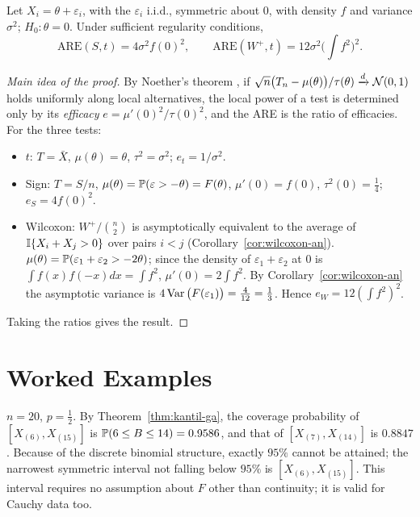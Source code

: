 \documentclass[main.tex]{subfiles}
\begin{document}
\begin{theorem}\label{thm:pitman-are}
Let $X_i=\theta+\varepsilon_i$, with the $\varepsilon_i$ i.i.d., symmetric about $0$, with density $f$ and variance $\sigma^2$; $H_0:\theta=0$. Under sufficient regularity conditions,
\[
\mathrm{ARE}(S,t)=4\sigma^2f(0)^2,\qquad\mathrm{ARE}(W^+,t)=12\sigma^2\Big(\int f^2\Big)^2 .
\]
\end{theorem}
\begin{proof}[Main idea of the proof]
By Noether's theorem \cite[Chapter~14]{vdv}, if $\sqrt n\big(T_n-\mu(\theta)\big)/\tau(\theta)\dto\Normal(0,1)$ holds uniformly along local alternatives, the local power of a test is determined only by its \emph{efficacy} $e=\mu'(0)^2/\tau(0)^2$, and the ARE is the ratio of efficacies. For the three tests:
\begin{itemize}
  \item $t$: $T=\bar X$, $\mu(\theta)=\theta$, $\tau^2=\sigma^2$; $e_t=1/\sigma^2$.
  \item Sign: $T=S/n$, $\mu(\theta)=\P(\varepsilon>-\theta)=F(\theta)$, $\mu'(0)=f(0)$, $\tau^2(0)=\frac14$; $e_S=4f(0)^2$.
  \item Wilcoxon: $W^+/\binom n2$ is asymptotically equivalent to the average of $\I\{X_i+X_j>0\}$ over pairs $i<j$ (Corollary~\ref{cor:wilcoxon-an}). $\mu(\theta)=\P(\varepsilon_1+\varepsilon_2>-2\theta)$; since the density of $\varepsilon_1+\varepsilon_2$ at $0$ is $\int f(x)f(-x)dx=\int f^2$, $\mu'(0)=2\int f^2$. By Corollary~\ref{cor:wilcoxon-an} the asymptotic variance is $4\Var\big(F(\varepsilon_1)\big)=\frac4{12}=\frac13$. Hence $e_W=12(\int f^2)^2$.
\end{itemize}
Taking the ratios gives the result.
\end{proof}

\section{Worked Examples}

\begin{example}\label{ex:medyan-ga}
$n=20$, $p=\frac12$. By Theorem~\ref{thm:kantil-ga}, the coverage probability of $[X_{(6)},X_{(15)}]$ is $\P(6\le B\le14)=0.9586$, and that of $[X_{(7)},X_{(14)}]$ is $0.8847$. Because of the discrete binomial structure, exactly $95\%$ cannot be attained; the narrowest symmetric interval not falling below $95\%$ is $[X_{(6)},X_{(15)}]$. This interval requires no assumption about $F$ other than continuity; it is valid for Cauchy data too.
\end{example}
\end{document}
